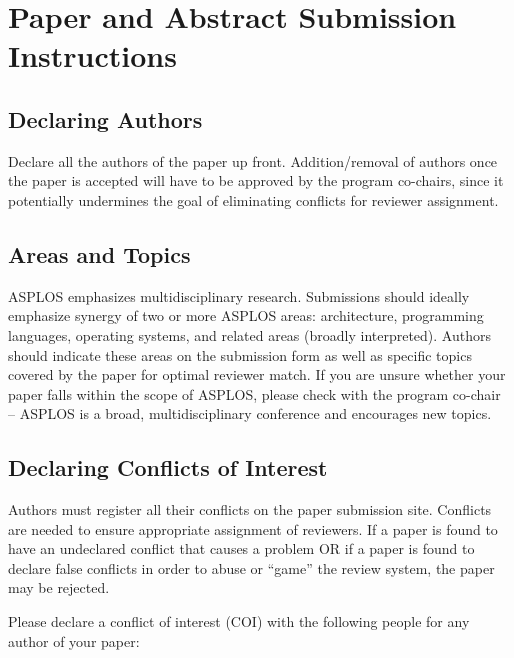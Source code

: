 \documentclass[pageno]{jpaper}
\begin{document}
\section{Paper and Abstract Submission Instructions}

\subsection{Declaring Authors}

Declare all the authors of the paper up front. Addition/removal of authors
once the paper is accepted will have to be approved by the program co-chairs,
since it potentially undermines the goal of eliminating conflicts for
reviewer assignment.

\subsection{Areas and Topics}

ASPLOS emphasizes multidisciplinary research. Submissions should ideally
emphasize synergy of two or more ASPLOS areas: architecture, programming
languages, operating systems, and related areas (broadly
interpreted). Authors should indicate these areas on the submission form as
well as specific topics covered by the paper for optimal reviewer match. If
you are unsure whether your paper falls within the scope of ASPLOS, please
check with the program co-chair -- ASPLOS is a broad, multidisciplinary
conference and encourages new topics.

\subsection{Declaring Conflicts of Interest}

Authors must register all their conflicts on the paper submission site.
Conflicts are needed to ensure appropriate assignment of reviewers.
If a paper is found to have an undeclared conflict that causes
a problem OR if a paper is found to declare false conflicts in order to
abuse or ``game'' the review system, the paper may be rejected.

Please declare a conflict of interest (COI) with the following people
for any author of your paper:
\end{document}
